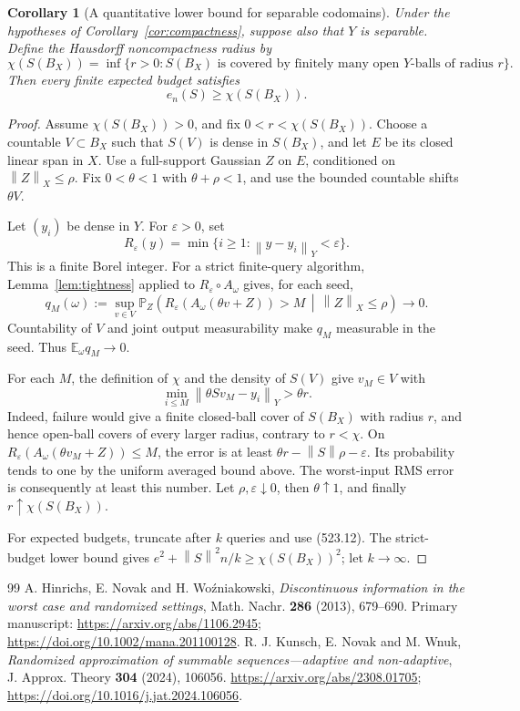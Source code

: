 \documentclass[11pt,a4paper]{article}
\newcommand{\E}{\mathbb E}
\newcommand{\Pbb}{\mathbb P}
\newcommand{\norm}[1]{\left\lVert#1\right\rVert}
\newtheorem{corollary}[theorem]{Corollary}
\theoremstyle{definition}
\theoremstyle{remark}
\numberwithin{equation}{section}
\begin{document}
\begin{corollary}[A quantitative lower bound for separable codomains]
\label{cor:noncompactness-radius}
Under the hypotheses of Corollary~\ref{cor:compactness}, suppose also
that \(Y\) is separable. Define the Hausdorff noncompactness radius by
\[
 \chi(S(B_X))=\inf\bigl\{r>0:S(B_X)\text{ is covered by finitely
 many open }Y\text{-balls of radius }r\bigr\}.
\]
Then every finite expected budget satisfies
\[
                         e_n(S)\ge\chi(S(B_X)).
\]
\end{corollary}
\begin{proof}
Assume \(\chi(S(B_X))>0\), and fix \(0<r<\chi(S(B_X))\).
Choose a countable \(V\subset B_X\) such that \(S(V)\) is dense
in \(S(B_X)\), and let \(E\) be its closed linear span in \(X\).
Use a full-support Gaussian \(Z\) on \(E\), conditioned on
\(\norm Z_X\le\rho\). Fix \(0<\theta<1\) with \(\theta+\rho<1\),
and use the bounded countable shifts \(\theta V\).

Let \((y_i)\) be dense in \(Y\). For \(\varepsilon>0\), set
\[
       R_\varepsilon(y)=\min\{i\ge1:\norm{y-y_i}_Y<\varepsilon\}.
\]
This is a finite Borel integer. For a strict finite-query algorithm,
Lemma~\ref{lem:tightness} applied to \(R_\varepsilon\circ A_\omega\)
gives, for each seed,
\[
 q_M(\omega):=\sup_{v\in V}
 \Pbb_Z\!\left(R_\varepsilon(A_\omega(\theta v+Z))>M
                    \,\middle|\,\norm Z_X\le\rho\right)
                         \longrightarrow0.
\]
Countability of \(V\) and joint output measurability make \(q_M\)
measurable in the seed. Thus \(\E_\omega q_M\to0\).

For each \(M\), the definition of \(\chi\) and the density of \(S(V)\)
give \(v_M\in V\) with
\[
              \min_{i\le M}\norm{\theta Sv_M-y_i}_Y>\theta r.
\]
Indeed, failure would give a finite closed-ball cover of
\(S(B_X)\) with radius \(r\), and hence open-ball covers of every
larger radius, contrary to \(r<\chi\).
On \(R_\varepsilon(A_\omega(\theta v_M+Z))\le M\), the error is
at least \(\theta r-\norm S\rho-\varepsilon\). Its probability tends
to one by the uniform averaged bound above. The worst-input RMS
error is consequently at least this number. Let
\(\rho,\varepsilon\downarrow0\), then \(\theta\uparrow1\), and
finally \(r\uparrow\chi(S(B_X))\).

For expected budgets, truncate after \(k\) queries and use
(523.12). The strict-budget lower bound gives
\(e^2+\norm S^2n/k\ge\chi(S(B_X))^2\); let \(k\to\infty\).
\end{proof}


\begin{thebibliography}{99}
A. Hinrichs, E. Novak and H. Wo\'zniakowski, \emph{Discontinuous information in the worst case and randomized settings}, Math. Nachr. \textbf{286} (2013), 679--690. Primary manuscript: \url{https://arxiv.org/abs/1106.2945}; \url{https://doi.org/10.1002/mana.201100128}.
R. J. Kunsch, E. Novak and M. Wnuk, \emph{Randomized approximation of summable sequences---adaptive and non-adaptive}, J. Approx. Theory \textbf{304} (2024), 106056. \url{https://arxiv.org/abs/2308.01705}; \url{https://doi.org/10.1016/j.jat.2024.106056}.
\end{thebibliography}
\end{document}
